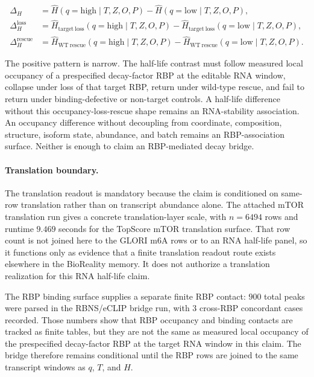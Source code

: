 $$
\begin{aligned}
 \Delta_H
 &= \widehat{H}(q=\mathrm{high}\mid T,Z,O,P)
    - \widehat{H}(q=\mathrm{low}\mid T,Z,O,P),\\
 \Delta_H^{\mathrm{loss}}
 &= \widehat{H}_{\mathrm{target\ loss}}(q=\mathrm{high}\mid T,Z,O,P)
    - \widehat{H}_{\mathrm{target\ loss}}(q=\mathrm{low}\mid T,Z,O,P),\\
 \Delta_H^{\mathrm{rescue}}
 &= \widehat{H}_{\mathrm{WT\ rescue}}(q=\mathrm{high}\mid T,Z,O,P)
    - \widehat{H}_{\mathrm{WT\ rescue}}(q=\mathrm{low}\mid T,Z,O,P).
\end{aligned}
$$

The positive pattern is narrow.  The half-life contrast must follow measured local occupancy of a prespecified decay-factor RBP at the editable RNA window, collapse under loss of that target RBP, return under wild-type rescue, and fail to return under binding-defective or non-target controls.  A half-life difference without this occupancy-loss-rescue shape remains an RNA-stability association.  An occupancy difference without decoupling from coordinate, composition, structure, isoform state, abundance, and batch remains an RBP-association surface.  Neither is enough to claim an RBP-mediated decay bridge.

\paragraph{Translation boundary.}
The translation readout is mandatory because the claim is conditioned on same-row translation rather than on transcript abundance alone.  The attached mTOR translation run gives a concrete translation-layer scale, with $n=6494$ rows and runtime $9.469$ seconds for the TopScore mTOR translation surface.  That row count is not joined here to the GLORI m6A rows or to an RNA half-life panel, so it functions only as evidence that a finite translation readout route exists elsewhere in the BioReality memory.  It does not authorize a translation realization for this RNA half-life claim.

The RBP binding surface supplies a separate finite RBP contact: $900$ total peaks were parsed in the RBNS/eCLIP bridge run, with $3$ cross-RBP concordant cases recorded.  Those numbers show that RBP occupancy and binding contacts are tracked as finite tables, but they are not the same as measured local occupancy of the prespecified decay-factor RBP at the target RNA window in this claim.  The bridge therefore remains conditional until the RBP rows are joined to the same transcript windows as $q$, $T$, and $H$.

